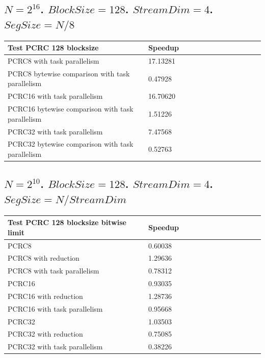 \documentclass[fleqn]{IEEEtran}
\begin{document}
\subsection{$N=2^{16}$. $BlockSize=128$. $StreamDim=4$. $SegSize=N/8$}
\begin{footnotesize}
\begin{tabular}{l|l|l|l|l|r|r|r|r|r|r||c|c|}
\toprule
\textbf{Test PCRC 128 blocksize} & \textbf{Speedup} \\
\midrule
PCRC8 with task parallelism                     &	17.13281 \\
PCRC8 bytewise comparison with task parallelism &	0.47928  \\
PCRC16 with task parallelism                     &	16.70620 \\
PCRC16 bytewise comparison with task parallelism &	1.51226  \\
PCRC32 with task parallelism                     &	7.47568  \\
PCRC32 bytewise comparison with task parallelism &	0.52763  \\
\bottomrule
\end{tabular}
\end{footnotesize}

\subsection{$N=2^{10}$. $BlockSize=128$. $StreamDim=4$. $SegSize=N/StreamDim$}
\begin{footnotesize}
	\begin{tabular}{l|l|l|l|l|r|r|r|r|r|r||c|c|}
		\toprule
		\textbf{Test PCRC 128 blocksize bitwise limit} & \textbf{Speedup} \\
		\midrule
		PCRC8                                           &	0.60038	 \\
		PCRC8 with reduction                            & 1.29636	 \\
		PCRC8 with task parallelism                     &	0.78312 \\
		PCRC16                                           &	0.93035 \\
		PCRC16 with reduction                            & 1.28736	 \\
		PCRC16 with task parallelism                     &	0.95668 \\
		PCRC32                                           & 1.03503	\\
		PCRC32 with reduction                            & 0.75085	 \\
		PCRC32 with task parallelism                     &	0.38226  \\
		\bottomrule
	\end{tabular}
\end{footnotesize}
\end{document}
